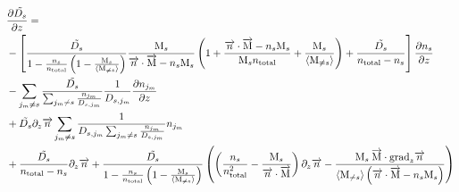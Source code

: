 \begin{landscape}
\begin{equation}
\begin{split}
& \frac{\partial\tilde{D_s}}{\partial z}  = \\
          & - \left[\frac{\tilde{D_s}}{1-\frac{n_s}{n_\text{total}}\left(1 - \frac{\text{M}_s}{\langle\text{M}_{\neq s}\rangle}\right)}
                  \frac{\text{M}_s}{\overrightarrow{n}\cdot\overrightarrow{\text{M}} - n_s\text{M}_s} 
                        \left(1 + \frac{\overrightarrow{n}\cdot\overrightarrow{\text{M}} - n_s\text{M}_s}{\text{M}_sn_\text{total}} + \frac{\text{M}_s}{\langle\text{M}_{\neq s}\rangle}\right)
                  + \frac{\tilde{D_s}}{n_\text{total} - n_s}\right]
                \frac{\partial n_s}{\partial z} \\
          & - \sum_{j_m\neq s}\frac{\tilde{D_s}}{\sum_{j_m \neq s}\frac{n_{j_m}}{D_{s,j_m}}}
                                \frac{1}{D_{s,j_m}} \frac{\partial n_{j_m}}{\partial z} \\
          & +  \tilde{D_s}\partial_{z}{\overrightarrow{n}} \sum_{j_m\neq s}
                           \frac{1}{D_{s,j_m}\sum_{j_m \neq s}\frac{n_{j_m}}{D_{s,j_m}}}
                                        n_{j_m} \\
          & + \frac{\tilde{D_s}}{n_\text{total} - n_s}\partial_{z}{\overrightarrow{n}} 
            + \frac{\tilde{D_s}}{1-\frac{n_s}{n_\text{total}}\left(1 - \frac{\text{M}_s}{\langle\text{M}_{\neq s}\rangle}\right)}
              \left(\left(\frac{n_s}{n_\text{total}^2} - \frac{\text{M}_s}{\overrightarrow{n}\cdot\overrightarrow{\text{M}}}\right)\partial_{z}{\overrightarrow{n}}
                        - \frac{\text{M}_s\:\overrightarrow{\text{M}}\cdot\text{grad}_{z}\overrightarrow{n}}
                               {\langle\text{M}_{\neq s}\rangle\left(\overrightarrow{n}\cdot\overrightarrow{\text{M}} - n_s\text{M}_s\right)}
                    \right)\\
\end{split}
\label{Titan:diff_deriv_D_tilde}
\end{equation}
\end{landscape}


